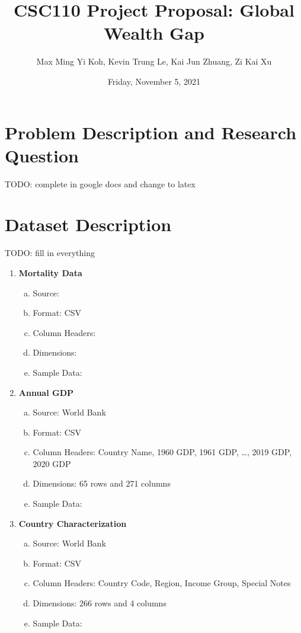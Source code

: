 \documentclass[fontsize=11pt]{article}
\title{CSC110 Project Proposal: Global Wealth Gap}
\author{Max Ming Yi Koh, Kevin Trung Le, Kai Jun Zhuang, Zi Kai Xu}
\date{Friday, November 5, 2021}
\begin{document}
\maketitle

\section*{Problem Description and Research Question}

TODO: complete in google docs and change to latex

\section*{Dataset Description}
TODO: fill in everything
\begin{enumerate}
    \item \textbf{Mortality Data}
        \begin{enumerate}[(a)]
            \item Source:
            \item Format: CSV
            \item Column Headers:
            \item Dimensions:
            \item Sample Data:
        \end{enumerate}
    \item \textbf{Annual GDP}
        \begin{enumerate}[(a)]
            \item Source: World Bank
            \item Format: CSV
            \item Column Headers: Country Name, 1960 GDP, 1961 GDP, …, 2019 GDP, 2020 GDP
            \item Dimensions: 65 rows and 271 columns
            \item Sample Data:
        \end{enumerate}
    \item \textbf{Country Characterization}
        \begin{enumerate}[(a)]
            \item Source: World Bank
            \item Format: CSV
            \item Column Headers: Country Code, Region, Income Group, Special Notes
            \item Dimensions: 266 rows and 4 columns
            \item Sample Data:

\end{enumerate}
\end{enumerate}
\end{document}
